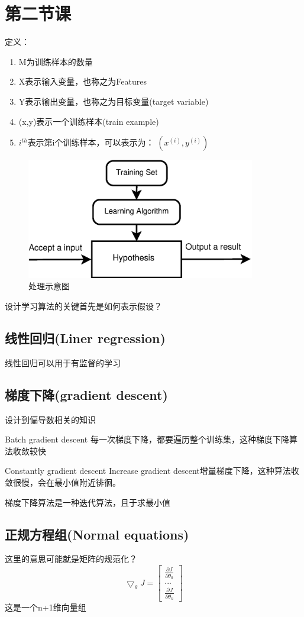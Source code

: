\documentclass[a4paper,12pt]{ctexbook}
\begin{document}
\section{第二节课}
定义：
\begin{enumerate}
  \item M为训练样本的数量
  \item X表示输入变量，也称之为Features
  \item Y表示输出变量，也称之为目标变量(target variable)
  \item (x,y)表示一个训练样本(train example)
  \item $i^{th}$表示第i个训练样本，可以表示为： $(x^{(i)},y^{(i)})$
\end{enumerate}
\begin{figure}
  \centering
  \includegraphics[width=10cm]{figure/ML_process.eps}
  \caption{处理示意图}\label{ML_process}
\end{figure}



设计学习算法的关键首先是如何表示假设？


\subsection{线性回归(Liner regression)}


线性回归可以用于有监督的学习


\subsection{梯度下降(gradient descent)}
设计到偏导数相关的知识

Batch gradient descent 每一次梯度下降，都要遍历整个训练集，这种梯度下降算法收敛较快

Constantly gradient descent
Increase gradient descent增量梯度下降，这种算法收敛很慢，会在最小值附近徘徊。

梯度下降算法是一种迭代算法，且于求最小值

\subsection{正规方程组(Normal equations)}
这里的意思可能就是矩阵的规范化？
\begin{equation}
\bigtriangledown_{\theta}J=
{
    \left[
        \begin{array}{ccc}
            \frac{\partial J}{\partial \theta_0}\\
            ...\\
            \frac{\partial J}{\partial \theta_n}
        \end{array}
    \right ]
}
\end{equation}
这是一个n+1维向量组
\end{document}
